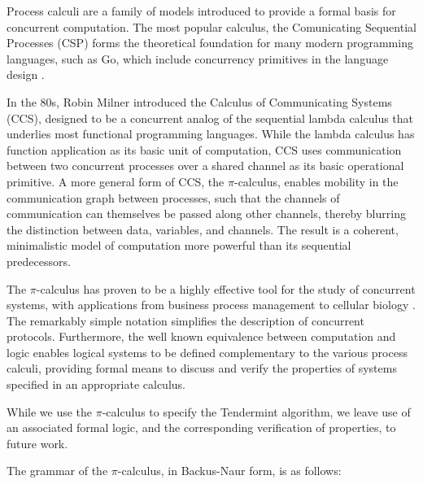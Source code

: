 Process calculi are a family of models introduced 
to provide a formal basis for concurrent computation.
The most popular calculus, the Comunicating Sequential Processes (CSP) \cite{csp}
forms the theoretical foundation for many modern programming languages,
such as Go, which include concurrency primitives in the language design \cite{csp_go}.

In the 80s, Robin Milner introduced the Calculus of Communicating Systems (CCS), 
designed to be a concurrent analog of the sequential lambda calculus that underlies most functional programming languages.
While the lambda calculus has function application as its basic unit of computation,
CCS uses communication between two concurrent processes over a shared channel as its basic operational primitive.
A more general form of CCS, the $\pi$-calculus, 
enables mobility in the communication graph between processes, 
such that the channels of communication can themselves be passed along other channels,
thereby blurring the distinction between data, variables, and channels.
The result is a coherent, minimalistic model of computation more powerful than its sequential predecessors.

The $\pi$-calculus has proven to be a highly effective tool for the study of concurrent systems,
with applications from business process management \cite{lucchi2007pi} to cellular biology \cite{phillips2007efficient}.
The remarkably simple notation simplifies the description of concurrent protocols.
Furthermore, the well known equivalence between computation and logic \cite{abramsky1994proofs} enables
logical systems to be defined complementary to the various process calculi,
providing formal means to discuss and verify the properties of systems specified in an appropriate calculus.

While we use the $\pi$-calculus to specify the Tendermint algorithm, 
we leave use of an associated formal logic, and the corresponding verification of properties, to future work.

The grammar of the $\pi$-calculus, in Backus-Naur form, is as follows:


